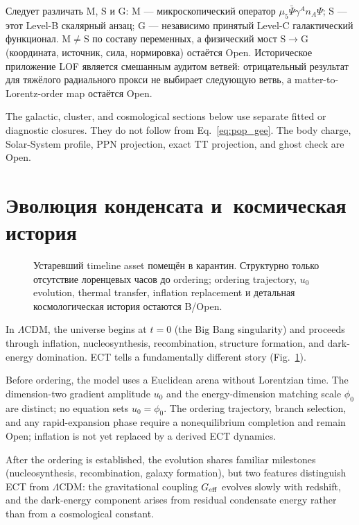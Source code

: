 \documentclass[11pt,a4paper]{article}
\begin{document}
Следует различать M, S и G: M — микроскопический оператор $\mu_5\bar\Psi\gamma^A n_A\Psi$; S — этот Level-B скалярный анзац; G — независимо принятый Level-C галактический функционал. M$\neq$S по составу переменных, а физический мост S$\to$G (координата, источник, сила, нормировка) остаётся Open. Историческое приложение LOF является смешанным аудитом ветвей: отрицательный результат для тяжёлого радиального прокси не выбирает следующую ветвь, а matter-to-Lorentz-order map остаётся Open.

The galactic, cluster, and cosmological sections below use separate fitted or diagnostic closures.  They do not follow from Eq.~\eqref{eq:pop_gee}.  The body charge, Solar-System profile, PPN projection, exact TT projection, and ghost check are Open.


\section{Эволюция конденсата и~космическая история}
\label{sec:pop_evolution}

\begin{figure}[H]
\centering
{}
\caption{Устаревший timeline asset помещён в карантин. Структурно только отсутствие лоренцевых часов до ordering; ordering trajectory, $u_0$ evolution, thermal transfer, inflation replacement и детальная космологическая история остаются B/Open.}
\label{fig:pop_timeline}
\end{figure}

In $\Lambda$CDM, the universe begins at $t=0$ (the Big Bang singularity) and proceeds through inflation, nucleosynthesis, recombination, structure formation, and dark-energy domination. ECT tells a fundamentally different story (Fig.~\ref{fig:pop_timeline}).

Before ordering, the model uses a Euclidean arena without Lorentzian time.  The dimension-two gradient amplitude $u_0$ and the energy-dimension matching scale $\phi_0$ are distinct; no equation sets $u_0=\phi_0$.  The ordering trajectory, branch selection, and any rapid-expansion phase require a nonequilibrium completion and remain Open; inflation is not yet replaced by a derived ECT dynamics.

After the ordering is established, the evolution shares familiar milestones (nucleosynthesis, recombination, galaxy formation), but two features distinguish ECT from $\Lambda$CDM: the gravitational coupling $G_{\rm eff}$ evolves slowly with redshift, and the dark-energy component arises from residual condensate energy rather than from a cosmological constant.
\end{document}
